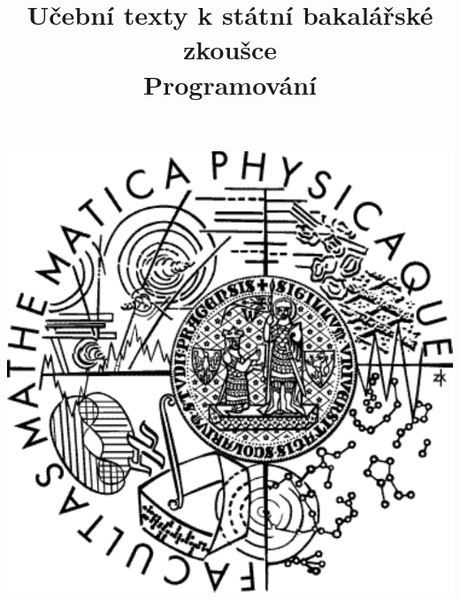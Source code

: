 \clearpage

\clearpage

\title{\LARGE Učební texty k státní bakalářské zkoušce \\ Programování}




\maketitle

\vspace{10mm}
\begin{center}
\includegraphics[scale=0.5]{../common/logo.pdf}
\end{center} 

\clearpage

\clearpage

\tableofcontents

\newpage


